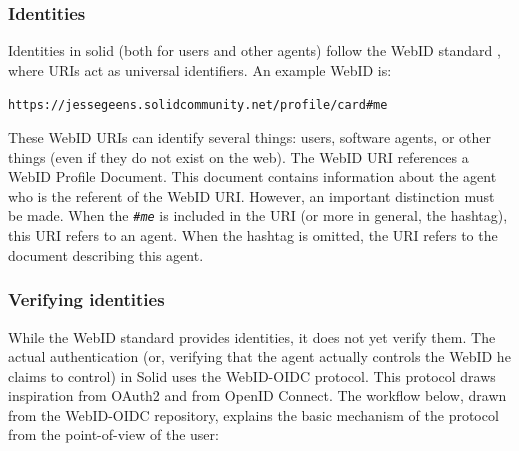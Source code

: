 \subsubsection{Identities}
Identities in solid (both for users and other agents) follow the WebID standard \citep{webid}, where URIs act as universal identifiers. An example WebID is:

\begin{center}
   \texttt{https://jessegeens.solidcommunity.net/profile/card\#me}\\
\end{center}

\noindent These WebID URIs can identify several things: users, software agents, or other things (even if they do not exist on the web). The WebID URI references a WebID Profile Document. This document contains information about the agent who is the referent of the WebID URI. However, an important distinction must be made. When the \textit{\texttt{\#me}} is included in the URI (or more in general, the hashtag), this URI refers to an agent. When the hashtag is omitted, the URI refers to the document describing this agent.

\newpage
{}



\subsubsection{Verifying identities}
While the WebID standard provides identities, it does not yet verify them. The actual authentication (or, verifying that the agent actually controls the WebID he claims to control) in Solid uses the WebID-OIDC protocol. This protocol draws inspiration from OAuth2 and from OpenID Connect. The workflow below, drawn from the WebID-OIDC repository, explains the basic mechanism of the protocol from the point-of-view of the user:

